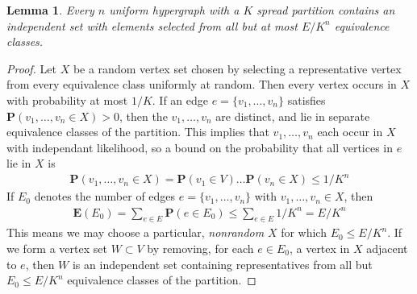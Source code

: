 \documentclass{article}
\theoremstyle{plain}
\newtheorem{lemma}{Lemma}
\newtheorem*{corollary}{Corollary}
\theoremstyle{plain}
\begin{document}
\begin{lemma}
	Every $n$ uniform hypergraph with a $K$ spread partition contains an independent set with elements selected from all but at most $E/K^n$ equivalence classes.
\end{lemma}
\begin{proof}
	Let $X$ be a random vertex set chosen by selecting a representative vertex from every equivalence class uniformly at random. Then every vertex occurs in $X$ with probability at most $1/K$. If an edge $e = \{ v_1, \dots, v_n \}$ satisfies $\mathbf{P}(v_1, \dots, v_n \in X) > 0$, then the $v_1, \dots, v_n$ are distinct, and lie in separate equivalence classes of the partition. This implies that $v_1, \dots, v_n$ each occur in $X$ with independant likelihood, so a bound on the probability that all vertices in $e$ lie in $X$ is
	\begin{align*}
		\mathbf{P}(v_1, \dots, v_n \in X) = \mathbf{P}(v_1 \in V) \dots \mathbf{P}(v_n \in X) \leq 1/K^n
	\end{align*}
	If $E_0$ denotes the number of edges $e = \{ v_1, \dots, v_n \}$ with $v_1, \dots, v_n \in X$, then
	\begin{align*}
		\mathbf{E}(E_0) = \sum_{e \in E} \mathbf{P}(e \in E_0) \leq \sum_{e \in E} 1/K^n = E/K^n
	\end{align*}
	This means we may choose a particular, {\it nonrandom} $X$ for which $E_0 \leq E/K^n$. If we form a vertex set $W \subset V$ by removing, for each $e \in E_0$, a vertex in $X$ adjacent to $e$, then $W$ is an independent set containing representatives from all but $E_0 \leq E/K^n$ equivalence classes of the partition.
\end{proof}

\end{document}

